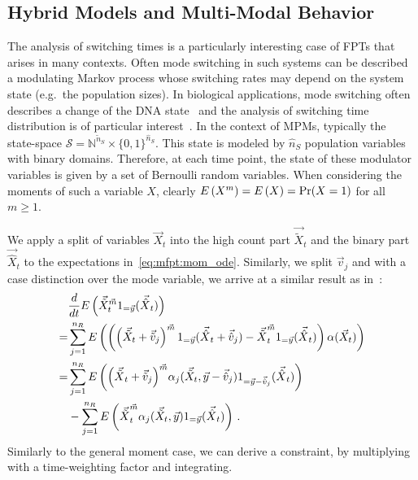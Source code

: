 \subsection{Hybrid Models and Multi-Modal Behavior}
The analysis of switching times is a particularly interesting case of \acp{FPT} that
arises in many   contexts.
Often mode switching in such systems can be described a modulating Markov process
whose switching rates may depend on the system state (e.g.\ the population sizes).
In biological applications, mode switching often describes a change of the
\acs{DNA} state~\cite{hasenauer2014method,stekel2008strong} and the analysis of
switching time distribution is of particular interest~\cite{spieler2011model,barzel2008calculation}.
In the context of \acp{MPM}, typically the state-space $\mathcal{S}=
\mathbb{N}^{\tilde{n}_S}\times {\{0,1\}}^{\hat{n}_S}$.
This state is modeled by  $\hat{n}_S$ population variables with
binary domains. Therefore, at each time point, the state of these modulator variables
is given by a set of Bernoulli random variables.
When considering the moments of
such a variable $X$, clearly ${E}\left(X^m\right)={E}\left(X\right)=\Pr(X=1)$ for all $m\geq 1$.


We apply a  split of variables $\vec X_t$  into the high count part ${\vec{\tilde{X}}}_t$ and the binary
part ${\vec{\hat{X}}}_t$ to
the expectations in~\eqref{eq:mfpt:mom_ode}. Similarly, we split   $\vec v_j$ and
with a case
distinction over the mode variable,
we arrive at a similar result as in~\cite{hasenauer2014method}:
\begin{equation}\label{eq:mcm}
\begin{split}
	& \frac{d}{dt}{E}\left(\vec{\tilde{X}}^{{\vec m}}_t 1_{=\vec y}({\vec{\hat{X}}}_t)\right)\\
   =&\sum_{j=1}^{n_R}
   {E}\left(\left(\left(\vec{\tilde{X}}_t+\vec{\tilde{v}}_j\right)^{\vec
   m}1_{=\vec y}({\vec{\hat{X}}}_t+\vec{\hat{v}}_j)
       -{\vec{\tilde{X}}}_t^{\vec
       m}1_{=\vec y}({\vec{\hat{X}}}_t)\right)\alpha(\vec X_t) \right)\\
    =&\sum_{j=1}^{n_R}
        {E}\left({\left(
                {\vec{\tilde{{X}}}}_t+\vec{\tilde{{v}}}_j
            \right)}^{\vec{m}}\alpha_j(\vec{\tilde{{X}}}_t, \vec{{y}} -
            \vec{\hat{v}}_j)
            1_{={\vec{y}- \vec{\hat{v}}_j}}({\vec{\hat{X}}}_t )\right)\\
    &- \sum_{j=1}^{n_R}
    {E}\left({\vec{\tilde{{X}}}}_t^{\vec{m}}\alpha_j(\vec{\tilde{{X}}}_t,
                {\vec{y}})
            1_{=\vec y}({\vec{\hat{X}}}_t)\right)\,.
            \end{split}
\end{equation}
Similarly to the general moment case, we can derive a constraint, by multiplying with a time-weighting factor
and integrating.

